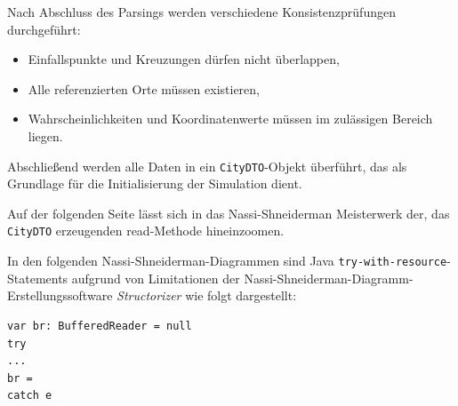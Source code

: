 \clearpage

Nach Abschluss des Parsings werden verschiedene Konsistenzprüfungen durchgeführt:
\begin{itemize}
  \item Einfallspunkte und Kreuzungen dürfen nicht überlappen,
  \item Alle referenzierten Orte müssen existieren,
  \item Wahrscheinlichkeiten und Koordinatenwerte müssen im zulässigen Bereich liegen.
\end{itemize}

Abschließend werden alle Daten in ein \texttt{CityDTO}-Objekt überführt,
das als Grundlage für die Initialisierung der Simulation dient.

Auf der folgenden Seite lässt sich in das Nassi-Shneiderman Meisterwerk der, das \texttt{CityDTO} erzeugenden read-Methode hineinzoomen.
\begin{tcolorbox}[colback=blue!5!white, colframe=blue!75!black, title=Hinweis]
In den folgenden Nassi-Shneiderman-Diagrammen sind Java \texttt{try-with-resource}-Statements aufgrund von 
Limitationen der Nassi-Shneiderman-Diagramm-Erstellungssoftware \emph{Structorizer} wie folgt dargestellt:
\begin{verbatim}
var br: BufferedReader = null
try
...
br =
catch e
\end{verbatim}
\end{tcolorbox}

